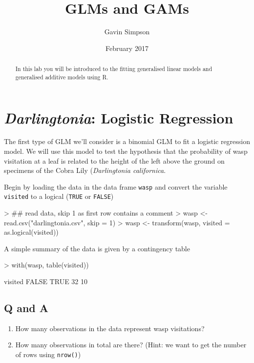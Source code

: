 \documentclass[a4paper,10pt]{article}
\newcommand{\R}{\textsf{R}\xspace}
\begin{document}
\title{GLMs and GAMs}
\author{Gavin Simpson}
\date{February 2017}
\maketitle

\begin{abstract}
In this lab you will be introduced to the fitting generalised linear models and generalised additive models using \R.
\end{abstract}

\section{\textit{Darlingtonia}: Logistic Regression}
The first type of GLM we'll consider is a binomial GLM to fit a logistic regression model. We will use this model to test the hypothesis that the probability of wasp visitation at a leaf is related to the height of the left above the ground on specimens of the Cobra Lily (\textit{Darlingtonia californica}.

Begin by loading the data in the data frame \texttt{wasp} and convert the variable \texttt{visited} to a logical (\texttt{TRUE} or \texttt{FALSE})

\begin{Schunk}
\begin{Sinput}
> ## read data, skip 1 as first row contains a comment
> wasp <- read.csv("darlingtonia.csv", skip = 1)
> wasp <- transform(wasp, visited = as.logical(visited))
\end{Sinput}
\end{Schunk}

A simple summary of the data is given by a contingency table

\begin{Schunk}
\begin{Sinput}
> with(wasp, table(visited))
\end{Sinput}
\begin{Soutput}
visited
FALSE  TRUE 
   32    10 
\end{Soutput}
\end{Schunk}

\subsection*{Q and A}
\begin{enumerate}
\item How many observations in the data represent wasp visitations?
\item How many observations in total are there? (Hint: we want to get the number of rows using \texttt{nrow()})
\end{enumerate}
\end{document}

